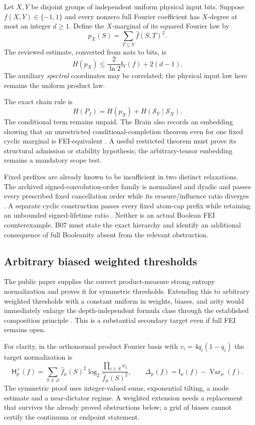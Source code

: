 \documentclass[11pt]{article}
\newcommand{\HH}{\mathsf H}\newcommand{\I}{\mathsf I}
\newcommand{\Var}{\operatorname{Var}}\newcommand{\wh}[1]{\widehat{#1}}
\begin{document}
Let $X,Y$ be disjoint groups of independent uniform physical input
bits. Suppose $f(X,Y)\in\{-1,1\}$ and every nonzero full Fourier
coefficient has $X$-degree at most an integer $d\ge1$. Define the
$X$-marginal of its squared Fourier law by
\[
 p_X(S)=\sum_{T\subseteq Y}\wh f(S,T)^2.
\]
The reviewed estimate, converted from nats to bits, is
\[
 H(p_X)\le\frac2{\ln2}\I_Y(f)+2(d-1).
\]
The auxiliary \emph{spectral} coordinates may be correlated; the
physical input law here remains the uniform product law.

The exact chain rule is
\[
 H(P_f)=H(p_X)+H(\mathcal S_Y\mid\mathcal S_X).
\]
The conditional term remains unpaid. The Brain also records an
embedding showing that an unrestricted conditional-completion
theorem even for one fixed cyclic marginal is FEI-equivalent
\cite{Brain54}. A useful restricted theorem must prove its
structural admission or stability hypothesis; the arbitrary-tensor
embedding remains a mandatory scope test.

Fixed prefixes are already known to be insufficient in two
distinct relaxations. The archived signed-convolution-order
family is normalized and dyadic and passes every prescribed
fixed cancellation order while its erasure/influence ratio
diverges \cite{BrainBooleanOrder}. A separate cyclic construction
passes every fixed atom-cap prefix while retaining an unbounded
signed-lifetime ratio \cite{Brain51}. Neither is an actual Boolean
FEI counterexample. B07 must state the exact hierarchy and
identify an additional consequence of full Booleanity absent
from the relevant obstruction.


\subsection{Arbitrary biased weighted thresholds}\label{sec:weighted-guards}

The public paper supplies the correct product-measure strong entropy normalization and proves it for symmetric thresholds. Extending this to arbitrary weighted thresholds with a constant uniform in weights, biases, and arity would immediately enlarge the depth-independent formula class through the established composition principle \cite{ODT,Threshold}. This is a substantial secondary target even if full FEI remains open.

For clarity, in the orthonormal product Fourier basis with
$v_i=4q_i(1-q_i)$ the target normalization is
\[
 \HH_\mu^+(f)=\sum_{S\ne\varnothing}\wh f_\mu(S)^2
       \log_2\frac{\prod_{i\in S}v_i}{\wh f_\mu(S)^2},
 \qquad
 \Delta_\mu(f)=\I_\mu(f)-\Var_\mu(f).
\]
The symmetric proof uses integer-valued sums, exponential
tilting, a mode estimate and a near-dictator regime. A weighted
extension needs a replacement that survives the already proved
obstructions below; a grid of biases cannot certify the
continuum or endpoint statement.
\end{document}
